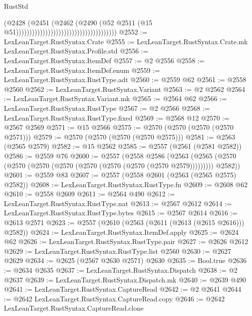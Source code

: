 \begin{lexlean}{RustStd}
\begin{coremodule}
                                                                    (@2428
                                                                      (@2451
                                                                        (@2462
                                                                          (@2490
                                                                            (@52
                                                                              @2511
                                                                              (@15
                                                                                @51))))))))))))))))))))))))))))))))))))))
@2552 := LexLeanTarget.RustSyntax.Crate
@2555 := LexLeanTarget.RustSyntax.Crate.mk LexLeanTarget.RustSyntax.Profile.std
@2556 := LexLeanTarget.RustSyntax.ItemDef
@2557 := @2 @2556
@2558 := LexLeanTarget.RustSyntax.ItemDef.enum
@2559 := LexLeanTarget.RustSyntax.RustType.adt
@2560 := @2559 @62
@2561 := @2558 @2560
@2562 := LexLeanTarget.RustSyntax.Variant
@2563 := @2 @2562
@2564 := LexLeanTarget.RustSyntax.Variant.mk
@2565 := @2564 @62
@2566 := LexLeanTarget.RustSyntax.RustType
@2567 := @2 @2566
@2568 := LexLeanTarget.RustSyntax.RustType.fixed
@2569 := @2568 @12
@2570 := @2567 @2569
@2571 := @15 @2566
@2575 := @2570 (@2570 (@2570 (@2570 @2571)))
@2579 := @2570 (@2570 (@2570 (@2570 @2575)))
@2581 := @2563 (@2565 @2579)
@2582 := @15 @2562
@2585 := @2557 (@2561 (@2581 @2582))
@2586 := @2559 @76
@2600 := @2557
    (@2558
      @2586
      (@2563 (@2565 (@2570 (@2570 (@2570 (@2570 (@2570 (@2570 (@2570 (@2570 @2579))))))))) @2582))
@2601 := @2559 @83
@2607 := @2557 (@2558 @2601 (@2563 (@2565 @2575) @2582))
@2608 := LexLeanTarget.RustSyntax.RustType.fn
@2609 := @2608 @62
@2610 := @2558 @2609
@2611 := @2564 @490
@2612 := LexLeanTarget.RustSyntax.RustType.nat
@2613 := @2567 @2612
@2614 := LexLeanTarget.RustSyntax.RustType.bytes
@2615 := @2567 @2614
@2616 := @2613 @2571
@2623 := @2557 (@2610 (@2563 (@2611 (@2613 (@2615 @2616))) @2582))
@2624 := LexLeanTarget.RustSyntax.ItemDef.apply
@2625 := @2624 @62
@2626 := LexLeanTarget.RustSyntax.RustType.pair
@2627 := @2626 @2612
@2629 := LexLeanTarget.RustSyntax.RustType.list @2560
@2630 := @2627 @2629
@2634 := @2625 (@2567 @2630 @2571) @2630
@2635 := Bool.true
@2636 := @2634 @2635
@2637 := LexLeanTarget.RustSyntax.Dispatch
@2638 := @2 @2637
@2639 := LexLeanTarget.RustSyntax.Dispatch.mk
@2640 := @2639 @490
@2641 := LexLeanTarget.RustSyntax.CaptureRead
@2642 := @2 @2641
@2644 := @2642 LexLeanTarget.RustSyntax.CaptureRead.copy
@2646 := @2642 LexLeanTarget.RustSyntax.CaptureRead.clone

\end{coremodule}
\end{lexlean}
